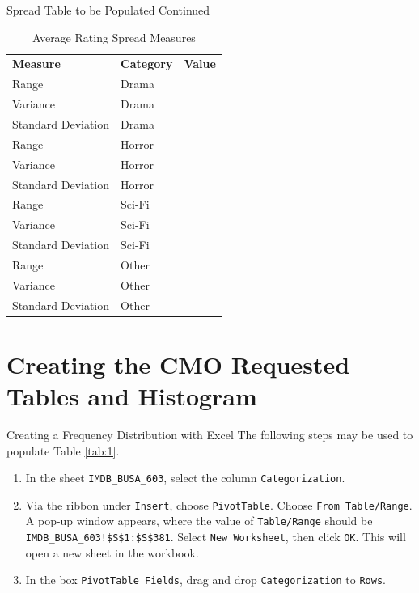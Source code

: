 \documentclass[pdf]{beamer}
\theoremstyle{remark}
\theoremstyle{definition}
\begin{document}
\begin{frame}[t]{Spread Table to be Populated Continued}
\begin{table}[htbp]
  \centering
    \captionsetup{justification=centering}
    \begin{tabular}{llr}
    \rowcolor[rgb]{ .851,  .882,  .949} \textbf{Measure} & \textbf{Category} & \multicolumn{1}{l}{\textbf{Value}} \\
    Range  & Drama &  \\
    Variance & Drama &  \\
    Standard Deviation & Drama &  \\
    Range  & Horror &  \\
    Variance & Horror &  \\
    Standard Deviation & Horror &  \\
    Range  & Sci-Fi &  \\
    Variance & Sci-Fi &  \\
    Standard Deviation & Sci-Fi &  \\
    Range  & Other &  \\
    Variance & Other &  \\
    Standard Deviation & Other &  \\
   \end{tabular}%
  \caption{Average Rating Spread Measures}
  \label{tab:averageratingst}%
\end{table}%
\end{frame}




\section{Creating the CMO Requested Tables and Histogram}

\begin{frame}[t]{Creating a Frequency Distribution with Excel}
The following steps may be used to populate Table \ref{tab:1}.\\
\vspace{1.5ex}
\begin{enumerate}
\item In the sheet \texttt{IMDB\_BUSA\_603}, select the column \texttt{Categorization}.
\item Via the ribbon under \texttt{Insert}, choose \texttt{PivotTable}.  Choose \texttt{From Table/Range}.  A pop-up window appears, where the value of \texttt{Table/Range} should be \texttt{IMDB\_BUSA\_603!\$S\$1:\$S\$381}.  Select \texttt{New Worksheet}, then click \texttt{OK}.  This will open a new sheet in the workbook.
\item In the box \texttt{PivotTable Fields}, drag and drop \texttt{Categorization} to \texttt{Rows}.
\end{enumerate}
\normalsize
\end{frame}
\end{document}
